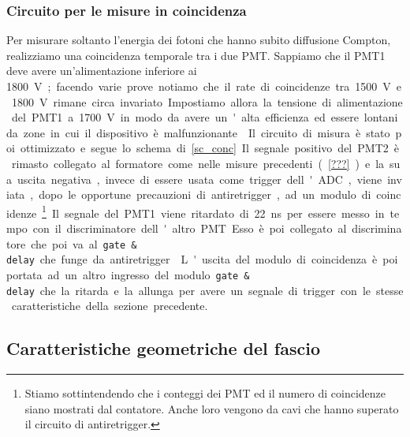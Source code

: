 \subsubsection{Circuito per le misure in coincidenza}

Per misurare soltanto l'energia dei fotoni che hanno subito diffusione Compton, realizziamo una coincidenza temporale tra i due PMT. Sappiamo che il PMT1 deve avere un'alimentazione inferiore ai \SI{1800}V; facendo varie prove notiamo che il rate di coincidenze tra \SI{1500}V e \SI{1800}V rimane circa invariato. Impostiamo allora la tensione di alimentazione del PMT1 a \SI{1700}V in modo da avere un'alta efficienza ed essere lontani da zone in cui il dispositivo è malfunzionante.

Il circuito di misura è stato poi ottimizzato e segue lo schema di \autoref{sc_conc}. Il segnale positivo del PMT2 è rimasto collegato al formatore come nelle misure precedenti (\autoref{???}) e la sua uscita negativa, invece di essere usata come trigger dell'ADC, viene inviata, dopo le opportune precauzioni di antiretrigger, ad un modulo di coincidenze%
\footnote{Stiamo sottintendendo che i conteggi dei PMT ed il numero di coincidenze siano mostrati dal contatore. Anche loro vengono da cavi che hanno superato il circuito di antiretrigger.}.

Il segnale del PMT1  viene ritardato di \SI{22}{ns} per essere messo in tempo con il discriminatore dell'altro PMT. Esso è poi collegato al discriminatore che poi va al \texttt{gate \& delay} che funge da antiretrigger.

L'uscita del modulo di coincidenza è poi portata ad un altro ingresso del modulo \texttt{gate \& delay} che la ritarda e la allunga per avere un segnale di trigger con le stesse caratteristiche della sezione precedente.


\subsection{Caratteristiche geometriche del fascio}

